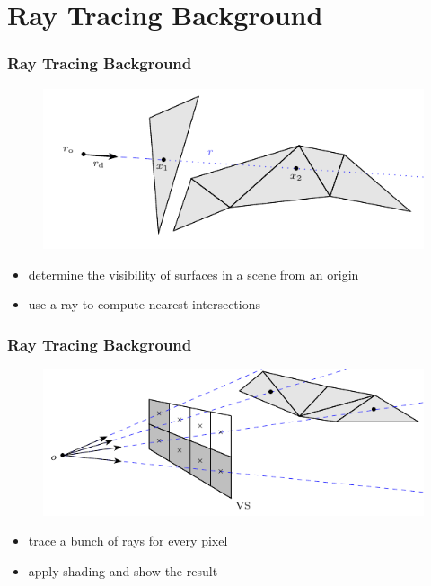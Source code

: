 \documentclass[aspectratio=169]{beamer}
\begin{document}
  \section{Ray Tracing Background} %
  \label{sec:ray_tracing_background}
  \begin{frame}
    \frametitle{Ray Tracing Background}
    \begin{figure}[H]
      \center
      \includegraphics{ray_tracing_1.pdf}
    \end{figure}
    \begin{itemize}
      \item determine the visibility of surfaces in a scene from an origin
      \item use a ray to compute nearest intersections
    \end{itemize}
  \end{frame}
  \begin{frame}
    \frametitle{Ray Tracing Background}
    \begin{figure}[H]
      \center
      \includegraphics{ray_tracing_2.pdf}
    \end{figure}
    \begin{itemize}
      \item trace a bunch of rays for every pixel
      \item apply shading and show the result
    \end{itemize}
  \end{frame}
\end{document}
